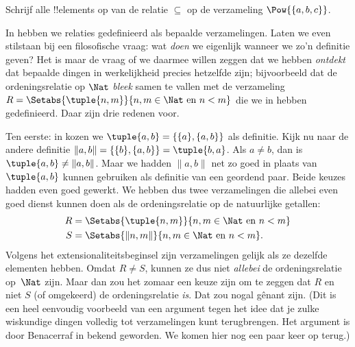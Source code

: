 \documentclass[openany]{memoir}
\begin{document}
\begin{prob}
  Schrijf alle !!{element}s op van de relatie $\subseteq$ op de verzameling
  $\Pow{\{a, b, c\}}$.
\end{prob}
\endgroup

\begingroup
\def\olfilename{OLP-0013}
\def\olfilepath{content/sets-functions-relations/relations/}
\hypertarget{unit-OLP-0013}{}
%



In  hebben we relaties gedefinieerd als bepaalde
verzamelingen. Laten we even stilstaan bij een filosofische vraag: wat
\emph{doen} we eigenlijk wanneer we zo'n definitie geven? Het is maar
de vraag of we daarmee willen zeggen dat we hebben \emph{ontdekt}
dat bepaalde dingen in werkelijkheid precies hetzelfde zijn;
bijvoorbeeld dat de ordeningsrelatie op $\Nat$ \emph{bleek} samen te
vallen met de verzameling $R=
\Setabs{\tuple{n,m}}{n, m \in \Nat\text{ en } n < m}$ die we in
 hebben gedefinieerd. Daar zijn drie
redenen voor.

Ten eerste: in  kozen we
$\tuple{a, b} = \{\{a\}, \{a, b\}\}$ als definitie. Kijk nu naar de
andere definitie $\lVert a, b\rVert = \{\{b\}, \{a, b\}\} =
\tuple{b,a}$. Als $a \neq b$, dan is $\tuple{a, b} \neq \lVert
a,b\rVert$. Maar we hadden $\lVert a,b\rVert$ net zo goed in plaats
van $\tuple{a,b}$ kunnen gebruiken als definitie van een geordend paar.
Beide keuzes hadden even goed gewerkt. We hebben dus twee
verzamelingen die allebei even goed dienst kunnen doen als de
ordeningsrelatie op de natuurlijke getallen:
\begin{align*}
		R &= \Setabs{\tuple{n,m}}{n, m \in \Nat \text{ en }n < m}\\
		S &= \Setabs{\lVert n,m\rVert}{n, m \in \Nat \text{ en }n < m}.
\end{align*}
Volgens het extensionaliteitsbeginsel zijn verzamelingen gelijk als ze
dezelfde elementen hebben. Omdat $R \neq S$, kunnen ze dus niet
\emph{allebei} de ordeningsrelatie op~$\Nat$ zijn.
Maar dan zou het zomaar een keuze zijn om te zeggen dat $R$ en niet $S$
(of omgekeerd) de ordeningsrelatie \emph{is}. Dat zou nogal gênant
zijn. (Dit is een heel eenvoudig voorbeeld van een argument tegen het
idee dat je zulke wiskundige dingen volledig tot verzamelingen kunt
terugbrengen. Het argument is door Benacerraf in
\citeyear{Benacerraf1965} bekend geworden. We komen hier nog een paar
keer op terug.)
\end{document}
